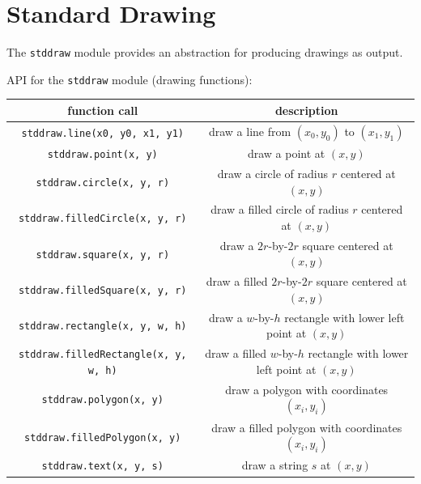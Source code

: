 \documentclass[8pt,a4paper,compress,handout]{beamer}
\begin{document}
\section{Standard Drawing}
\begin{frame}[fragile]
The \lstinline{stddraw} module provides an abstraction for producing drawings as output.

\bigskip

API for the \lstinline{stddraw} module (drawing functions):
\begin{center}
\begin{tabular}{cc}
function call & description \\ \hline
\lstinline$stddraw.line(x0, y0, x1, y1)$ & draw a line from $(x_0, y_0)$ to $(x_1, y_1)$ \\
\lstinline$stddraw.point(x, y)$ & draw a point at $(x, y)$ \\
\lstinline$stddraw.circle(x, y, r)$ & draw a circle of radius $r$ centered at $(x, y)$ \\
\lstinline$stddraw.filledCircle(x, y, r)$ & draw a filled circle of radius $r$ centered at $(x, y)$ \\
\lstinline$stddraw.square(x, y, r)$ & draw a $2r$-by-$2r$ square centered at $(x, y)$ \\
\lstinline$stddraw.filledSquare(x, y, r)$ & draw a filled $2r$-by-$2r$ square centered at $(x, y)$ \\
\lstinline$stddraw.rectangle(x, y, w, h)$ & \makecell{draw a $w$-by-$h$ rectangle \\ with lower left point at $(x, y)$} \\ 
\lstinline$stddraw.filledRectangle(x, y, w, h)$ & \makecell{draw a filled $w$-by-$h$ rectangle \\ with lower left point at $(x, y)$} \\
\lstinline$stddraw.polygon(x, y)$ & draw a polygon with coordinates $(x_i, y_i)$ \\
\lstinline$stddraw.filledPolygon(x, y)$ & draw a filled polygon with coordinates $(x_i, y_i)$ \\
\lstinline$stddraw.text(x, y, s)$ & draw a string $s$ at $(x, y)$ \\
\end{tabular} 
\end{center}
\end{frame}
\end{document}
